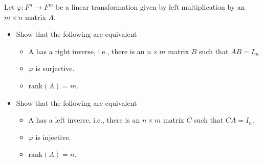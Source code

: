 \documentclass[openany]{book}
\begin{document}
\begin{exercise}
    Let $\varphi: F^n \to F^m$ be a linear transformation given by left multiplication by an $m \times n$ matrix $A$. 
    \begin{itemize}
    \item Show that the following are equivalent - 
    \begin{itemize}
        \item A has a right inverse, i.e., there is an $n \times m$ matrix $B$ such that $AB = I_m$.
        \item $\varphi$ is surjective.
        \item $\text{rank}(A) = m$.
    \end{itemize}
    \item Show that the following are equivalent -
    \begin{itemize}
        \item A has a left inverse, i.e., there is an $n \times m$ matrix $C$ such that $CA = I_n$.
        \item $\varphi$ is injective.
        \item $\text{rank}(A) = n$.
    \end{itemize}
    \end{itemize}
\end{exercise}
\end{document}
